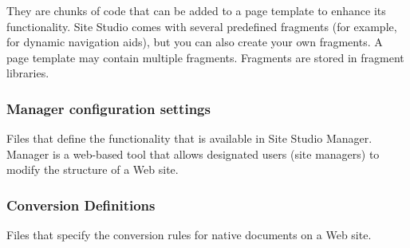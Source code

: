 They are chunks of code that can be added to a page template to enhance its
functionality. Site Studio comes with several predefined fragments
(for example, for dynamic navigation aids), but you can also create
your own fragments. A page template may contain multiple
fragments. Fragments are stored in fragment libraries.

\subsubsection{Manager configuration settings}

Files that define the functionality that is available in Site Studio
Manager. Manager is a web-based tool that allows designated users
(site managers) to modify the structure of a Web site.

\subsubsection{Conversion Definitions}

Files that specify the conversion rules for native documents on a Web
site.